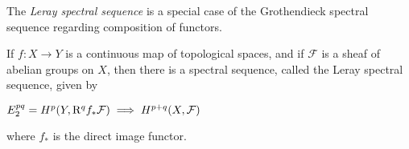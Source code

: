 \documentclass[12pt]{article}
\begin{document}
The \emph{Leray spectral sequence} is a special case of the Grothendieck spectral sequence regarding composition of functors.

If $f : X\to Y$ is a continuous map of topological spaces, and if $\mathcal{F}$ is a sheaf of abelian groups on $X$, then there is a spectral sequence, called the Leray spectral sequence, given by

$E_2^{pq} = H^p(Y,{\rm R}^q f_* \mathcal{F})\implies H^{p+q}(X,\mathcal{F})$

where $f_*$ is the direct image functor.
\end{document}
